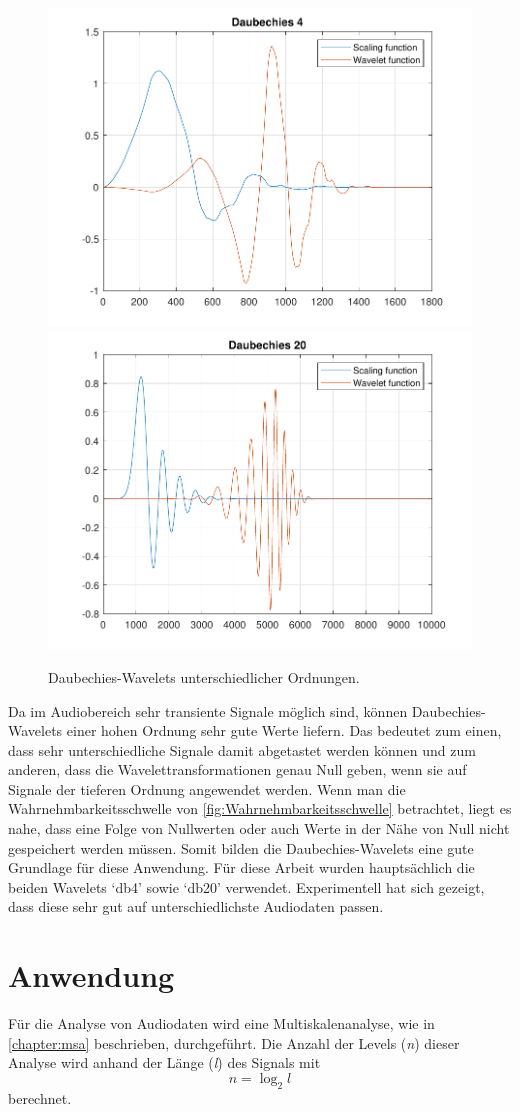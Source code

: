 \begin{refsection}
\begin{figure}
	\includegraphics[width=0.5\linewidth]{papers/compress/Bilder/db4}
	\includegraphics[width=0.5\linewidth]{papers/compress/Bilder/db20}
	\label{fig:dbN}
	\caption{Daubechies-Wavelets unterschiedlicher Ordnungen.}
\end{figure}

Da im Audiobereich sehr transiente Signale möglich sind, können Daubechies-Wavelets einer hohen Ordnung sehr gute Werte liefern.
Das bedeutet zum einen, dass sehr unterschiedliche Signale damit abgetastet werden können und zum anderen, dass die Wavelettransformationen genau Null geben, wenn sie auf Signale der tieferen Ordnung angewendet werden.
Wenn man die Wahrnehmbarkeitsschwelle von \autoref{fig:Wahrnehmbarkeitsschwelle} betrachtet, liegt es nahe, dass eine Folge von Nullwerten oder auch Werte in der Nähe von Null nicht gespeichert werden müssen.
Somit bilden die Daubechies-Wavelets eine gute Grundlage für diese Anwendung.
Für diese Arbeit wurden hauptsächlich die beiden Wavelets `db4' sowie `db20' verwendet.
Experimentell hat sich gezeigt, dass diese sehr gut auf unterschiedlichste Audiodaten passen.

\section{Anwendung}
Für die Analyse von Audiodaten wird eine Multiskalenanalyse, wie in \autoref{chapter:msa} beschrieben, durchgeführt.
Die Anzahl der Levels (\textit{n}) dieser Analyse wird anhand der Länge (\textit{l}) des Signals mit
\begin{equation}
\textit{n} = \log_2{\textit{l}}
\end{equation}
berechnet.


\end{refsection}
